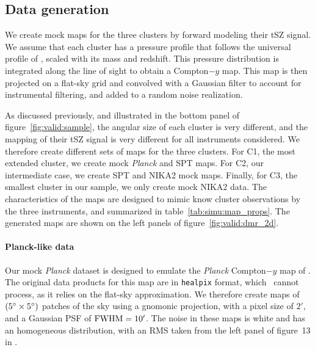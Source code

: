 \subsection{Data generation}

We create mock maps for the three clusters by forward modeling their tSZ signal.
We assume that each cluster has a pressure profile that follows the universal profile of \aten, scaled with its mass and redshift.
This pressure distribution is integrated along the line of sight to obtain a Compton$-y$ map.
This map is then projected on a flat-sky grid and convolved with a Gaussian filter to account for instrumental filtering, and added to a random noise realization.

As discussed previously, and illustrated in the bottom panel of figure~\ref{fig:valid:sample}, the angular size of each cluster is very different, and the mapping of their tSZ signal is very different for all instruments considered.
We therefore create different sets of maps for the three clusters.
For C1, the most extended cluster, we create mock \textit{Planck} and SPT maps.
For C2, our intermediate case, we create SPT and NIKA2 mock maps.
Finally, for C3, the smallest cluster in our sample, we only create mock NIKA2 data.
The characteristics of the maps are designed to mimic know cluster observations by the three instruments, and summarized in table~\ref{tab:simu:map_props}.
The generated maps are shown on the left panels of figure~\ref{fig:valid:dmr_2d}.

\paragraph{Planck-like data}  %
Our mock \textit{Planck} dataset is designed to emulate the \textit{Planck} Compton$-y$ map of \citet{planck_collaboration_planck_2016}.
The original data products for this map are in \texttt{healpix} format, which \panco\ cannot process, as it relies on the flat-sky approximation.
We therefore create maps of $(5\degree \times 5\degree)$ patches of the sky using a gnomonic projection, with a pixel size of $2'$, and a Gaussian PSF of ${\rm FWHM} = 10'$.
The noise in these maps is white and has an homogeneous distribution, with an RMS taken from the left panel of figure~13 in \citet{planck_collaboration_planck_2016}.


